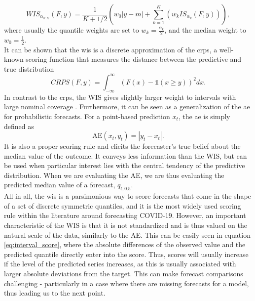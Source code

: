 \begin{equation}
WIS_{\alpha_{0:K}}(F,y) = \frac{1}{K + 1/2}\left(w_{0}|y-m| + \sum_{k=1}^{K}\left(w_k IS_{\alpha_{k}}(F, y)\right)\right),
\end{equation}
where usually the quantile weights are set to $w_k = \frac{\alpha_{k}}{2}$, and the median weight to $w_{0} = \frac{1}{2}$.\\
It can be shown that the \ac{wis} is a discrete approximation of the \ac{crps}, a well-known scoring function that measures the distance between the predictive and true distribution 
\begin{equation}
CRPS(F, y) = \int_{-\infty}^{\infty} \left(F(x) - \mathbb{1}(x \geq y) \right)^2dx.
\end{equation}
In contrast to the \ac{crps}, the WIS gives slightly larger weight to intervals with large nominal coverage \citep{bracher_evaluating_2021}. Furthermore, it can be seen as a generalization of the \ac{ae} for probabilistic forecasts. For a point-based prediction $x_t$, the \ac{ae} is simply defined as \\
\begin{equation}
\text{AE}(x_t, y_t) = |y_t - x_t|.
\end{equation}
It is also a proper scoring rule and elicits the forecaster's true belief about the median value of the outcome. It conveys less information than the WIS, but can be used when particular interest lies with the central tendency of the predictive distribution. When we are evaluating the AE, we are thus evaluating the predicted median value of a forecast, $q_{t,0.5}$. \\
All in all, the \ac{wis} is a parsimonious way to score forecasts that come in the shape of a set of discrete symmetric quantiles, and it is the most widely used scoring rule within the literature around forecasting COVID-19. %
However, an important characteristic of the WIS is that it is not standardized and is thus valued on the natural scale of the data, similarly to the AE. This can be easily seen in equation \ref{eq:interval_score}, where the absolute differences of the observed value and the predicted quantile directly enter into the score. Thus, scores will usually increase if the level of the predicted series increases, as this is usually associated with larger absolute deviations from the target. This can make forecast comparisons challenging - particularly in a case where there are missing forecasts for a model, thus leading us to the next point.
